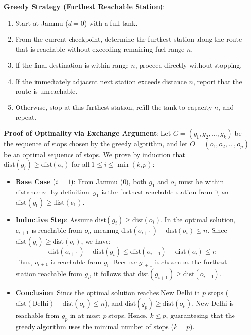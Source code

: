 \documentclass[12pt]{article}
\begin{document}
\textbf{Greedy Strategy (Furthest Reachable Station)}:
\begin{enumerate}
    \item Start at Jammu ($d = 0$) with a full tank.
    \item From the current checkpoint, determine the furthest station along the route that is reachable without exceeding remaining fuel range $n$.
    \item If the final destination is within range $n$, proceed directly without stopping.
    \item If the immediately adjacent next station exceeds distance $n$, report that the route is unreachable.
    \item Otherwise, stop at this furthest station, refill the tank to capacity $n$, and repeat.
\end{enumerate}

\textbf{Proof of Optimality via Exchange Argument}:
Let $G = (g_1, g_2, \dots, g_k)$ be the sequence of stops chosen by the greedy algorithm, and let $O = (o_1, o_2, \dots, o_p)$ be an optimal sequence of stops.
We prove by induction that $\text{dist}(g_i) \ge \text{dist}(o_i)$ for all $1 \le i \le \min(k, p)$:
\begin{itemize}
    \item \textbf{Base Case ($i = 1$)}: From Jammu ($0$), both $g_1$ and $o_1$ must be within distance $n$. By definition, $g_1$ is the furthest reachable station from $0$, so $\text{dist}(g_1) \ge \text{dist}(o_1)$.
    \item \textbf{Inductive Step}: Assume $\text{dist}(g_i) \ge \text{dist}(o_i)$. In the optimal solution, $o_{i+1}$ is reachable from $o_i$, meaning $\text{dist}(o_{i+1}) - \text{dist}(o_i) \le n$. Since $\text{dist}(g_i) \ge \text{dist}(o_i)$, we have:
    \[
    \text{dist}(o_{i+1}) - \text{dist}(g_i) \le \text{dist}(o_{i+1}) - \text{dist}(o_i) \le n
    \]
    Thus, $o_{i+1}$ is reachable from $g_i$. Because $g_{i+1}$ is chosen as the furthest station reachable from $g_i$, it follows that $\text{dist}(g_{i+1}) \ge \text{dist}(o_{i+1})$.
    \item \textbf{Conclusion}: Since the optimal solution reaches New Delhi in $p$ stops ($\text{dist}(\text{Delhi}) - \text{dist}(o_p) \le n$), and $\text{dist}(g_p) \ge \text{dist}(o_p)$, New Delhi is reachable from $g_p$ in at most $p$ stops. Hence, $k \le p$, guaranteeing that the greedy algorithm uses the minimal number of stops ($k = p$).
\end{itemize}
\end{document}
